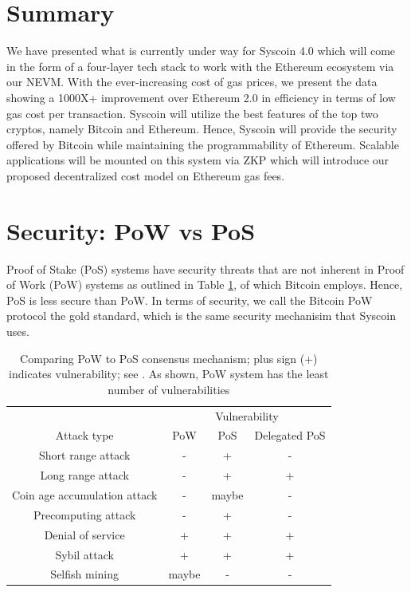 \documentclass[peerreview]{ieeesyscoin}
\begin{document}
\section{Summary}
\label{section:summary}
We have presented what is currently under way for Syscoin 4.0 which will come in the form of a four-layer tech stack to work with the Ethereum ecosystem via our NEVM. With the ever-increasing cost of gas prices, we present the data showing a 1000X+ improvement over Ethereum 2.0 in efficiency in terms of low gas cost per transaction. Syscoin will utilize the best features of the top two cryptos, namely Bitcoin and Ethereum. Hence, Syscoin will provide the security offered by Bitcoin while maintaining the programmability of Ethereum. Scalable applications will be mounted on this system via ZKP which will introduce our proposed decentralized cost model on Ethereum gas fees.

\appendices

\section{Security: PoW vs PoS}

Proof of Stake (PoS) systems have security threats that are not inherent in Proof of Work (PoW) systems as outlined in Table \ref{table:pow_vs_pos}, of which Bitcoin employs. Hence, PoS is less secure than PoW. In terms of security, we call the Bitcoin PoW protocol the gold standard, which is the same security mechanisim that Syscoin uses. 

\begin{table}[h!]
\centering
\begin{tabular}{ |c|c|c|c| } 
\hline
 & \multicolumn{3}{|c|}{ Vulnerability } \\
 Attack type & PoW & PoS & Delegated PoS \\
\hline
Short range attack & - & + & - \\
Long range attack & - & + & + \\
Coin age accumulation attack & - & maybe & - \\
Precomputing attack & - & + & - \\
Denial of service & + & + & + \\
Sybil attack & + & + & + \\
Selfish mining & maybe & - & - \\
\hline
\end{tabular}
\caption{Comparing PoW to PoS consensus mechanism; plus sign (+) indicates vulnerability; see \cite{Bit15}. As shown, PoW system has the least number of vulnerabilities}
\label{table:pow_vs_pos}
\end{table}
\end{document}
